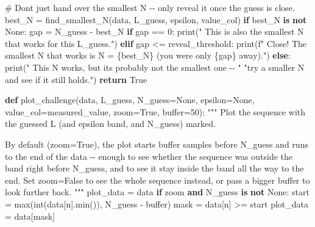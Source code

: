\documentclass[
  letterpaper,
  DIV=11,
  numbers=noendperiod]{scrreprt}
\newenvironment{Shaded}{\begin{snugshade}}{\end{snugshade}}
\newcommand{\BuiltInTok}[1]{\textcolor[rgb]{0.00,0.23,0.31}{#1}}
\newcommand{\CommentTok}[1]{\textcolor[rgb]{0.37,0.37,0.37}{#1}}
\newcommand{\ControlFlowTok}[1]{\textcolor[rgb]{0.00,0.23,0.31}{\textbf{#1}}}
\newcommand{\DecValTok}[1]{\textcolor[rgb]{0.68,0.00,0.00}{#1}}
\newcommand{\KeywordTok}[1]{\textcolor[rgb]{0.00,0.23,0.31}{\textbf{#1}}}
\newcommand{\NormalTok}[1]{\textcolor[rgb]{0.00,0.23,0.31}{#1}}
\newcommand{\OperatorTok}[1]{\textcolor[rgb]{0.37,0.37,0.37}{#1}}
\newcommand{\SpecialCharTok}[1]{\textcolor[rgb]{0.37,0.37,0.37}{#1}}
\newcommand{\SpecialStringTok}[1]{\textcolor[rgb]{0.13,0.47,0.30}{#1}}
\newcommand{\StringTok}[1]{\textcolor[rgb]{0.13,0.47,0.30}{#1}}
\newcommand{\VariableTok}[1]{\textcolor[rgb]{0.07,0.07,0.07}{#1}}
\theoremstyle{plain}
\theoremstyle{plain}
\theoremstyle{definition}
\theoremstyle{definition}
\theoremstyle{definition}
\theoremstyle{plain}
\theoremstyle{plain}
\theoremstyle{remark}
\begin{document}
\begin{Shaded}
\begin{Highlighting}[]
    \CommentTok{\# Don\textquotesingle{}t just hand over the smallest N {-}{-} only reveal it once the guess is close.}
\NormalTok{    best\_N }\OperatorTok{=}\NormalTok{ find\_smallest\_N(data, L\_guess, epsilon, value\_col)}
    \ControlFlowTok{if}\NormalTok{ best\_N }\KeywordTok{is} \KeywordTok{not} \VariableTok{None}\NormalTok{:}
\NormalTok{        gap }\OperatorTok{=}\NormalTok{ N\_guess }\OperatorTok{{-}}\NormalTok{ best\_N}
        \ControlFlowTok{if}\NormalTok{ gap }\OperatorTok{==} \DecValTok{0}\NormalTok{:}
            \BuiltInTok{print}\NormalTok{(}\StringTok{"  This is also the smallest N that works for this L\_guess."}\NormalTok{)}
        \ControlFlowTok{elif}\NormalTok{ gap }\OperatorTok{\textless{}=}\NormalTok{ reveal\_threshold:}
            \BuiltInTok{print}\NormalTok{(}\SpecialStringTok{f"  Close! The smallest N that works is N = }\SpecialCharTok{\{}\NormalTok{best\_N}\SpecialCharTok{\}}\SpecialStringTok{ (you were only }\SpecialCharTok{\{}\NormalTok{gap}\SpecialCharTok{\}}\SpecialStringTok{ away)."}\NormalTok{)}
        \ControlFlowTok{else}\NormalTok{:}
            \BuiltInTok{print}\NormalTok{(}\StringTok{"  This N works, but it\textquotesingle{}s probably not the smallest one {-}{-} "}
                  \StringTok{"try a smaller N and see if it still holds."}\NormalTok{)}
    \ControlFlowTok{return} \VariableTok{True}


\KeywordTok{def}\NormalTok{ plot\_challenge(data, L\_guess, N\_guess}\OperatorTok{=}\VariableTok{None}\NormalTok{, epsilon}\OperatorTok{=}\VariableTok{None}\NormalTok{, value\_col}\OperatorTok{=}\StringTok{\textquotesingle{}measured\_value\textquotesingle{}}\NormalTok{,}
\NormalTok{                    zoom}\OperatorTok{=}\VariableTok{True}\NormalTok{, }\BuiltInTok{buffer}\OperatorTok{=}\DecValTok{50}\NormalTok{):}
    \CommentTok{"""}
\CommentTok{    Plot the sequence with the guessed L (and epsilon band, and N\_guess) marked.}

\CommentTok{    By default (zoom=True), the plot starts \textasciigrave{}buffer\textasciigrave{} samples before N\_guess and}
\CommentTok{    runs to the end of the data {-}{-} enough to see whether the sequence was}
\CommentTok{    outside the band right before N\_guess, and to see it stay inside the band}
\CommentTok{    all the way to the end. Set zoom=False to see the whole sequence instead,}
\CommentTok{    or pass a bigger \textasciigrave{}buffer\textasciigrave{} to look further back.}
\CommentTok{    """}
\NormalTok{    plot\_data }\OperatorTok{=}\NormalTok{ data}
    \ControlFlowTok{if}\NormalTok{ zoom }\KeywordTok{and}\NormalTok{ N\_guess }\KeywordTok{is} \KeywordTok{not} \VariableTok{None}\NormalTok{:}
\NormalTok{        start }\OperatorTok{=} \BuiltInTok{max}\NormalTok{(}\BuiltInTok{int}\NormalTok{(data[}\StringTok{\textquotesingle{}n\textquotesingle{}}\NormalTok{].}\BuiltInTok{min}\NormalTok{()), N\_guess }\OperatorTok{{-}} \BuiltInTok{buffer}\NormalTok{)}
\NormalTok{        mask }\OperatorTok{=}\NormalTok{ data[}\StringTok{\textquotesingle{}n\textquotesingle{}}\NormalTok{] }\OperatorTok{\textgreater{}=}\NormalTok{ start}
\NormalTok{        plot\_data }\OperatorTok{=}\NormalTok{ data[mask]}


\end{Highlighting}
\end{Shaded}
\end{document}
